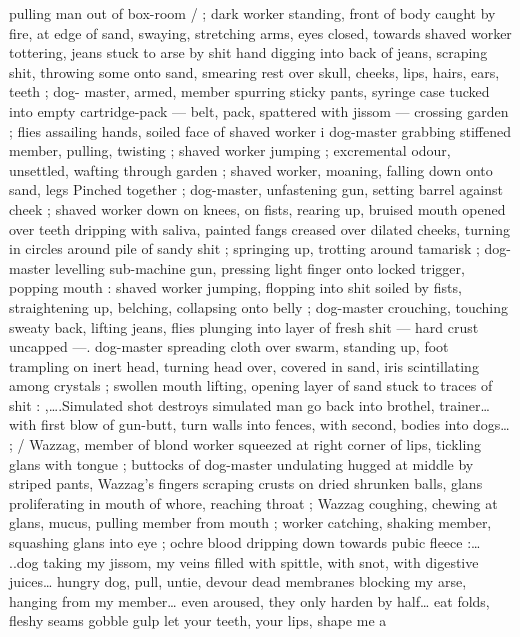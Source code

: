 pulling man out of box-room {\slash} ; dark worker standing, front of body 
caught by fire, at edge of sand, swaying, stretching arms, eyes 
closed, towards shaved worker tottering, jeans stuck to arse by shit 
hand digging into back of jeans, scraping shit, throwing some onto 
sand, smearing rest over skull, cheeks, lips, hairs, ears, teeth ; dog- 
master, armed, member spurring sticky pants, syringe case tucked 
into empty cartridge-pack --- belt, pack, spattered with jissom --- 
crossing garden ; flies assailing hands, soiled face of shaved worker 
i dog-master grabbing stiffened member, pulling, twisting ; shaved 
worker jumping ; excremental odour, unsettled, wafting through 
garden ; shaved worker, moaning, falling down onto sand, legs 
Pinched together ; dog-master, unfastening gun, setting barrel 
against cheek ; shaved worker down on knees, on fists, rearing up, 
bruised mouth opened over teeth dripping with saliva, painted fangs 
creased over dilated cheeks, turning in circles around pile of sandy 
shit ; springing up, trotting around tamarisk ; dog-master levelling 
sub-machine gun, pressing light finger onto locked trigger, popping 
mouth : shaved worker jumping, flopping into shit soiled by fists, 
straightening up, belching, collapsing onto belly ; dog-master 
crouching, touching sweaty back, lifting jeans, flies plunging into 
layer of fresh shit --- hard crust uncapped ---. dog-master spreading 
cloth over swarm, standing up, foot trampling on inert head, turning 
head over, covered in sand, iris scintillating among crystals ; swollen 
mouth lifting, opening layer of sand stuck to traces of shit : 
{\gl},{\ldots}.Simulated shot destroys simulated man{\td} go back into brothel, 
trainer{\ldots} with first blow of gun-butt, turn walls into fences, with 
second, bodies into dogs{\ldots}{\td} {\gr} ; {\slash} Wazzag, member of blond worker 
squeezed at right corner of lips, tickling glans with tongue ; buttocks 
of dog-master undulating hugged at middle by striped pants, 
Wazzag's fingers scraping crusts on dried shrunken balls, glans 
proliferating in mouth of whore, reaching throat ; Wazzag coughing, 
chewing at glans, mucus, pulling member from mouth ; worker 
catching, shaking member, squashing glans into eye ; ochre blood 
dripping down towards pubic fleece :{\ldots} {\gl}..dog taking my jissom, my 
veins filled with spittle, with snot, with digestive juices{\ldots} hungry dog, 
pull, untie, devour dead membranes blocking my arse, hanging from 
my member{\ldots} even aroused, they only harden by half{\ldots} eat folds, 
fleshy seams{\td} gobble{\td} gulp{\td} let your teeth, your lips, shape me a 
